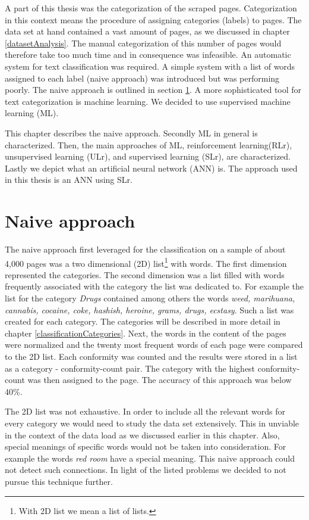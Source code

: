 \label{machineLearning}
A part of this thesis was the categorization of the scraped pages. Categorization in this context means the procedure of assigning categories (labels) to pages. The data set at hand contained a vast amount of pages, as we discussed in chapter \ref{datasetAnalysis}. The manual categorization of this number of pages would therefore take too much time and in consequence was infeasible. An automatic system for text classification was required. A simple system with a list of words assigned to each label (naive approach) was introduced but was performing poorly. The naive approach is outlined in section \ref{naiveApproach}. A more sophisticated tool for text categorization is machine learning. We decided to use supervised machine learning (ML).

This chapter describes the naive approach. Secondly ML in general is characterized. Then, the main approaches of ML, reinforcement learning(RLr), unsupervised learning (ULr), and supervised learning (SLr), are characterized. Lastly we depict what an artificial neural network (ANN) is. The approach used in this thesis is an ANN using SLr.


 \section{Naive approach} \label{naiveApproach}
The naive approach first leveraged for the classification on a sample of about 4,000 pages was a two dimensional (2D) list\footnote{With 2D list we mean a list of lists.} with words. The first dimension represented the categories. The second dimension was a list filled with words frequently associated with the category the list was dedicated to. For example the list for the category \textit{Drugs} contained among others the words \textit{weed, marihuana, cannabis, cocaine, coke, hashish, heroine, grams, drugs, ecstasy}. Such a list was created for each category. The categories will be described in more detail in chapter \ref{classificationCategories}. Next, the words in the content of the pages were normalized and the twenty most frequent words of each page were compared to the 2D list. Each conformity was counted and the results were stored in a list as a category - conformity-count pair. The category with the highest conformity-count was then assigned to the page. The accuracy of this approach was below 40\%.

The 2D list was not exhaustive. In order to include all the relevant words for every category we would need to study the data set extensively. This in unviable in the context of the data load as we discussed earlier in this chapter. Also, special meanings of specific words would not be taken into consideration. For example the words \textit{red room} have a special meaning. This naive approach could not detect such connections. In light of the listed problems we decided to not pursue this technique further.


